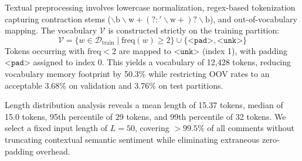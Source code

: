 \documentclass[10pt,twocolumn,letterpaper]{article}
\begin{document}
Textual preprocessing involves lowercase normalization, regex-based tokenization capturing contraction stems ($\backslash\text{b}\backslash\text{w}+(?:'\backslash\text{w}+)?\backslash\text{b}$), and out-of-vocabulary mapping. The vocabulary $\mathcal{V}$ is constructed strictly on the training partition:
\begin{equation}
\mathcal{V} = \{w \in \mathcal{D}_{\text{train}} \mid \text{freq}(w) \ge 2\} \cup \{\texttt{<pad>}, \texttt{<unk>}\}
\end{equation}
Tokens occurring with $\text{freq} < 2$ are mapped to $\texttt{<unk>}$ (index 1), with padding $\texttt{<pad>}$ assigned to index 0. This yields a vocabulary of 12,428 tokens, reducing vocabulary memory footprint by 50.3\% while restricting OOV rates to an acceptable 3.68\% on validation and 3.76\% on test partitions.

Length distribution analysis reveals a mean length of 15.37 tokens, median of 15.0 tokens, 95th percentile of 29 tokens, and 99th percentile of 32 tokens. We select a fixed input length of $L = 50$, covering $>99.5\%$ of all comments without truncating contextual semantic sentiment while eliminating extraneous zero-padding overhead.
\end{document}
